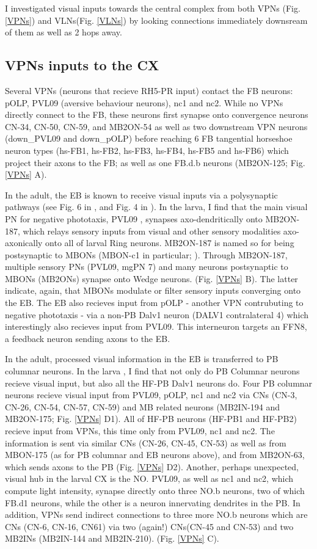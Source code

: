     I investigated visual inputs towards the central complex from both VPNs (Fig. \ref{VPNs}) and VLNs(Fig. \ref{VLNs}) by looking connections immediately downsream of them as well as 2 hops away.

    \subsection{VPNs inputs to the CX}
    Several VPNs (neurons that recieve RH5-PR input) contact the FB neurons: pOLP, PVL09 (aversive behaviour neurons), nc1 and nc2. While no VPNs directly connect to the FB, these neurons first synapse onto convergence neurons CN-34, CN-50, CN-59,  and MB2ON-54 as well as two downstream VPN neurons (down\_PVL09 and down\_pOLP) before reaching 6 FB tangential horseshoe neuron types (hs-FB1, hs-FB2, hs-FB3, hs-FB4, hs-FB5 and hs-FB6) which project their axons to the FB; as well as one FB.d.b neurons (MB2ON-125; Fig. \ref{VPNs} A).

    In the adult, the EB is known to receive visual inputs via a polysynaptic pathways (see Fig. 6 in \citep{hulse2021connectome}, and Fig. 4 in \citep{omoto2018neuronal}). In the larva, I find that the main visual PN for negative phototaxis, PVL09  \citep{Humberg2018PVL09}, synapses axo-dendritically onto MB2ON-187, which relays sensory inputs from visual and other sensory modalities axo-axonically onto all of larval Ring neurons.  MB2ON-187 is named so for being postsynaptic to MBONs (MBON-c1 in particular; \citep{eschbach2021circuits}). Through MB2ON-187, multiple sensory PNs (PVL09, mgPN 7) and many neurons postsynaptic to MBONs (MB2ONs) synapse onto Wedge neurons. (Fig. \ref{VPNs} B).
    The latter indicate, again, that MBONs modulate or filter sensory inputs converging onto the EB. The EB also recieves input from pOLP - another VPN contrubuting to negative phototaxis - via a non-PB Dalv1 neuron (DALV1 contralateral 4) which interestingly also recieves input from PVL09.  This interneuron targets an FFN8, a feedback neuron sending axons to the EB. 

    In the adult,  processed visual information in the EB is transferred to PB columnar neurons. In the larva , I find that not only do PB Columnar neurons recieve visual input, but also all the HF-PB Dalv1 neurons do.  Four PB columnar neurons recieve visual input from PVL09,  pOLP, nc1 and nc2 via CNs (CN-3, CN-26, CN-54, CN-57, CN-59) and MB related neurons (MB2IN-194 and MB2ON-175; Fig. \ref{VPNs} D1).  
    All of HF-PB neurons (HF-PB1 and HF-PB2) recieve input from VPNs, this time only from PVL09, nc1 and nc2. The information is sent via similar CNs (CN-26, CN-45, CN-53) as well as from MBON-175 (as for PB columnar and EB neurons above), and from MB2ON-63, which sends axons to the PB (Fig. \ref{VPNs} D2).  
    Another, perhaps unexpected, visual hub in the larval CX is the NO. PVL09, as well as nc1 and nc2, which compute light intensity, synapse directly onto three NO.b neurons, two of which FB.d1 neurons, while the other is a neuron innervating dendrites in the PB. In addition, VPNs send indirect connections to three more NO.b neurons which are CNs (CN-6, CN-16, CN61) via two (again!) CNs(CN-45 and CN-53) and two MB2INs (MB2IN-144 and MB2IN-210). (Fig. \ref{VPNs} C).

